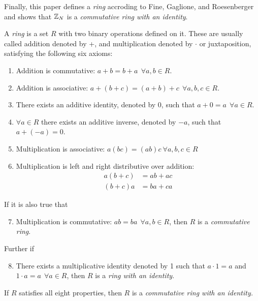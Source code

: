 \par Finally, this paper defines a {\em ring} accroding to Fine, Gaglione, and Roesenberger and
shows that $\mathbb{Z}_N$ is a {\em commutative ring with an identity}.
\begin{definition}
\label{def:ring}
  A {\em ring} is a set $R$ with two binary operations defined on it. These are usually
  called addition denoted by +, and multiplication denoted by $\cdot$ or juxtaposition,
  satisfying the following six axioms:
  \begin{enumerate}
    \item Addition is commutative: $a+b=b+a \ \ \forall a,b \in R$.
    \item Addition is associative: $a+(b+c)=(a+b)+c \ \ \forall a,b,c \in R$.
    \item There exists an additive identity, denoted by 0, such that $a+0=a \ \ \forall a \in R$.
    \item $\forall a \in R$ there exists an additive inverse, denoted by $-a$, such
      that $a+(-a)=0$.
    \item Multiplication is associative: $a(bc)=(ab)c \ \forall a,b,c \in R$
    \item Multiplication is left and right distributive over addition:
      \begin{align*}
        a(b+c)&=ab+ac \\
        (b+c)a&=ba+ca
      \end{align*}
  \end{enumerate}
  If it is also true that
  \begin{enumerate}
      \setcounter{enumi}{6}
    \item Multiplication is commutative: $ab=ba \ \ \forall a,b \in R$, then
      $R$ is a {\em commutative ring}.
  \end{enumerate}
  Further if
  \begin{enumerate}
      \setcounter{enumi}{7}
    \item There exists a multiplicative identity denoted by 1 such that
      $a \cdot 1=a$ and $1 \cdot a=a \ \ \forall a \in R$, then $R$ is a
      {\em ring with an identity}.
  \end{enumerate}
  If $R$ satisfies all eight properties, then $R$ is a {\em commutative ring with
  an identity.}
\end{definition}

